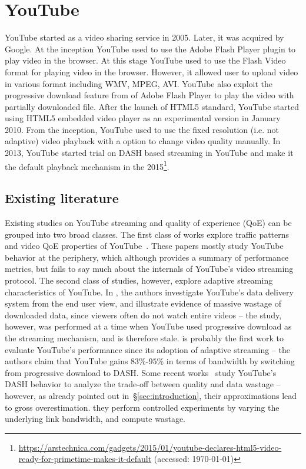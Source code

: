 \section{YouTube}
YouTube started as a video sharing service in 2005. Later, it was acquired by Google. At the inception YouTube used to use the Adobe Flash Player plugin to play video in the browser. At this stage YouTube used to use the Flash Video format for playing video in the browser. However, it allowed user to upload video in various format including WMV, MPEG, AVI. YouTube also exploit the progressive download feature from of Adobe Flash Player to play the video with partially downloaded file\cite{10.1145/1298306.1298310}. After the launch of HTML5 standard, YouTube started using HTML5 embedded video player as an experimental version in January 2010. From the inception, YouTube used to use the fixed resolution (i.e. not adaptive) video playback with a option to change video quality manually.
In 2013, YouTube started trial on DASH based streaming in YouTube and make it the default playback mechanism in the 2015\footnote{\url{https://arstechnica.com/gadgets/2015/01/youtube-declares-html5-video-ready-for-primetime-makes-it-default} (accessed: \today)}.

\subsection{Existing literature}
Existing studies on YouTube streaming and quality of experience (QoE) can be grouped into two broad classes. The first class of works explore traffic patterns and video QoE properties of YouTube~\cite{gill2007youtube,krishnappa2013dashing,wamser2016modeling,wamser2015poster,6757893ieeeexp,7129790ieeeexp}. These papers mostly study YouTube behavior at the periphery, which although provides a summary of performance metrics, but fails to say much about the internals of YouTube's video streaming protocol. The second class of studies, however, explore adaptive streaming characteristics of YouTube. In \cite{finamore2011youtube}, the authors investigate YouTube's data delivery system from the end user view, and illustrate evidence of massive wastage of downloaded data, since viewers often do not watch entire videos -- the study, however, was performed at a time when YouTube used progressive download as the streaming mechanism, and is therefore stale. \cite{krishnappa2013dashing} is probably the first work to evaluate YouTube's performance since its adoption of adaptive streaming -- the authors claim that YouTube gains $83\%$-$95\%$ in terms of bandwidth by switching from progressive download to DASH. Some recent works~\cite{sieber2015cost,seufert2015youtube,sieber2016sacrificing} study YouTube's DASH behavior to analyze the trade-off between quality and data wastage -- however, as already pointed out in~\S\ref{sec:introduction}, their approximations lead to gross overestimation. they perform controlled experiments by varying the underlying link bandwidth, and compute wastage.